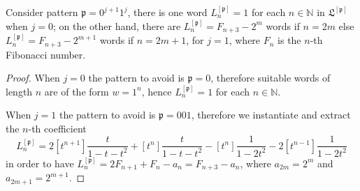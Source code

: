 \begin{corollary}
Consider pattern $\mathfrak{p}=0^{j+1}1^{j}$, there is one word
$L_{n}^{[\mathfrak{p}]} = 1$ for each $n\in\mathbb{N}$ in
$\mathfrak{L}^{[\mathfrak{p}]}$ when $j=0$; on the other hand, there are
$L_{n}^{[\mathfrak{p}]} = F_{n+3}-2^{m}$ words if $n=2m$ else
$L_{n}^{[\mathfrak{p}]} = F_{n+3}-2^{m+1}$ words if $n=2m+1$, for $j=1$, where
$F_{n}$ is the $n$-th Fibonacci number.
\end{corollary}

\begin{proof}
When $j=0$ the pattern to avoid is $\mathfrak{p}=0$, therefore suitable
words of length $n$ are of the form $w=1^{n}$, hence $L_{n}^{[\mathfrak{p}]} =
1$ for each $n\in\mathbb{N}$.

When $j=1$ the pattern to avoid is $\mathfrak{p}=001$, therefore we instantiate and
extract the $n$-th coefficient
\begin{displaymath}
L_{n}^{[\mathfrak{p}]} = 2[t^{n+1}]\frac{t}{1-t-t^{2}} + [t^{n}]\frac{t}{1-t-t^{2}}
- [t^{n}]\frac{1}{1-2t^{2}} - 2[t^{n-1}]\frac{1}{1-2t^{2}}
\end{displaymath}
in order to have $L_{n}^{[\mathfrak{p}]} = 2F_{n+1} + F_{n} - a_{n} = F_{n+3} - a_{n}$,
where $a_{2m}=2^{m}$ and $a_{2m+1}=2^{m+1}$.


\end{proof}
